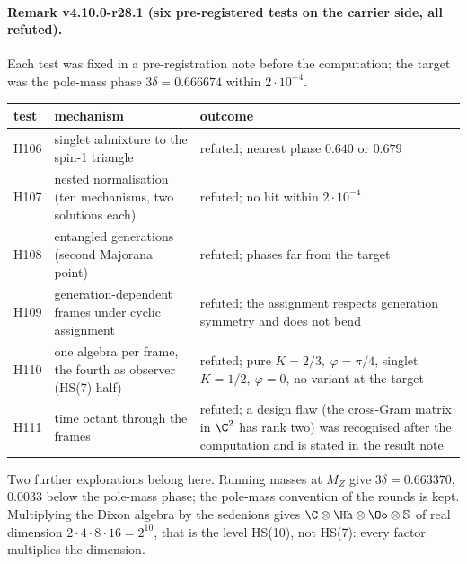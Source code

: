 \paragraph{Remark v4.10.0-r28.1 (six pre-registered tests on the carrier side, all refuted).}
Each test was fixed in a pre-registration note before the computation; the target was the pole-mass phase \(3\delta=0.666674\) within
\(2\cdot10^{-4}\).
\begin{center}
\small
\begin{tabular}{@{}>{\raggedright\arraybackslash}p{}>{\raggedright\arraybackslash}p{}>{\raggedright\arraybackslash}p{}@{}}
\toprule
test & mechanism & outcome\\
\midrule
H106 & singlet admixture to the spin-1 triangle & refuted; nearest phase \(0.640\) or \(0.679\)\\
H107 & nested normalisation (ten mechanisms, two solutions each) & refuted; no hit within \(2\cdot10^{-4}\)\\
H108 & entangled generations (second Majorana point) & refuted; phases far from the target\\
H109 & generation-dependent frames under cyclic assignment & refuted; the assignment respects generation symmetry and does not bend\\
H110 & one algebra per frame, the fourth as observer (HS(7) half) & refuted; pure \(K=2/3,\ \varphi=\pi/4\), singlet \(K=1/2,\ \varphi=0\), no variant at the target\\
H111 & time octant through the frames & refuted; a design flaw (the cross-Gram matrix in \(\C^2\) has rank two) was recognised after the computation and is
stated in the result note\\
\bottomrule
\end{tabular}
\end{center}
Two further explorations belong here.  Running masses at \(M_Z\) give \(3\delta=0.663370\), \(0.0033\) below the pole-mass phase; the
pole-mass convention of the rounds is kept.  Multiplying the Dixon algebra by the sedenions gives
\(\C\otimes\Hh\otimes\Oo\otimes\mathbb S\) of real dimension \(2\cdot4\cdot8\cdot16=2^{10}\), that is the level HS(10), not HS(7): every factor
multiplies the dimension.


